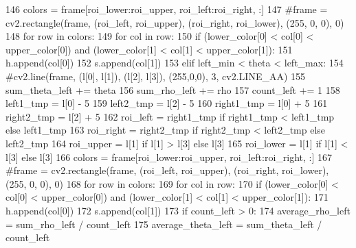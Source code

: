 \begin{DoxyCode}
146                   colors = frame[roi\_lower:roi\_upper, roi\_left:roi\_right, :]
147                   \textcolor{comment}{#frame = cv2.rectangle(frame, (roi\_left, roi\_upper), (roi\_right, roi\_lower), (255, 0, 0),
       0)}
148                   \textcolor{keywordflow}{for} row \textcolor{keywordflow}{in} colors:
149                       \textcolor{keywordflow}{for} col \textcolor{keywordflow}{in} row:
150                           \textcolor{keywordflow}{if} (lower\_color[0] < col[0] < upper\_color[0]) \textcolor{keywordflow}{and} (lower\_color[1] < col[1] < 
      upper\_color[1]):
151                               h.append(col[0])
152                               s.append(col[1])
153               \textcolor{keywordflow}{elif} left\_min < theta < left\_max:
154                   \textcolor{comment}{#cv2.line(frame, (l[0], l[1]), (l[2], l[3]), (255,0,0), 3, cv2.LINE\_AA)}
155                   sum\_theta\_left += theta
156                   sum\_rho\_left += rho
157                   count\_left += 1
158                   left1\_tmp = l[0] - 5
159                   left2\_tmp = l[2] - 5
160                   right1\_tmp = l[0] + 5
161                   right2\_tmp = l[2] + 5
162                   roi\_left = right1\_tmp \textcolor{keywordflow}{if} right1\_tmp < left1\_tmp \textcolor{keywordflow}{else} left1\_tmp
163                   roi\_right = right2\_tmp \textcolor{keywordflow}{if} right2\_tmp < left2\_tmp \textcolor{keywordflow}{else} left2\_tmp
164                   roi\_upper = l[1] \textcolor{keywordflow}{if} l[1] > l[3] \textcolor{keywordflow}{else} l[3]
165                   roi\_lower = l[1] \textcolor{keywordflow}{if} l[1] < l[3] \textcolor{keywordflow}{else} l[3]
166                   colors = frame[roi\_lower:roi\_upper, roi\_left:roi\_right, :]
167                   \textcolor{comment}{#frame = cv2.rectangle(frame, (roi\_left, roi\_upper), (roi\_right, roi\_lower), (255, 0, 0),
       0)}
168                   \textcolor{keywordflow}{for} row \textcolor{keywordflow}{in} colors:
169                       \textcolor{keywordflow}{for} col \textcolor{keywordflow}{in} row:
170                           \textcolor{keywordflow}{if} (lower\_color[0] < col[0] < upper\_color[0]) \textcolor{keywordflow}{and} (lower\_color[1] < col[1] < 
      upper\_color[1]):
171                               h.append(col[0])
172                               s.append(col[1])
173           \textcolor{keywordflow}{if} count\_left > 0:
174               average\_rho\_left = sum\_rho\_left / count\_left
175               average\_theta\_left = sum\_theta\_left / count\_left

\end{DoxyCode}
